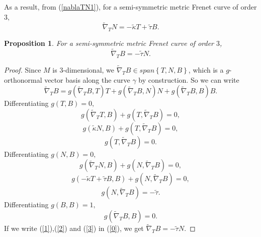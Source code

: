 \documentclass{amsart}
\theoremstyle{plain}
\newtheorem{proposition}{Proposition}
\theoremstyle{definition}
\theoremstyle{remark}
\numberwithin{equation}{section}
\begin{document}
As a result, from (\ref{nablaTN1}), for a semi-symmetric metric Frenet curve
of order $3,$ 
\begin{equation*}
\widetilde{\nabla }_{T}N=-\widetilde{\kappa }T+\widetilde{\tau }B.
\end{equation*}

\begin{proposition}
For a semi-symmetric metric Frenet curve of order $3$, 
\begin{equation*}
\widetilde{\nabla }_{T}B=-\widetilde{\tau }N.
\end{equation*}
\end{proposition}

\begin{proof}
Since $M$ is $3$-dimensional, we $\widetilde{\nabla }_{T}B\in span\left\{
T,N,B\right\} $, which is a $g$-orthonormal vector basis along the curve $%
\gamma $ by construction. So we can write%
\begin{equation}
\widetilde{\nabla }_{T}B=g\left( \widetilde{\nabla }_{T}B,T\right) T+g\left( 
\widetilde{\nabla }_{T}B,N\right) N+g\left( \widetilde{\nabla }%
_{T}B,B\right) B.  \label{0}
\end{equation}%
Differentiating $g\left( T,B\right) =0,$%
\begin{equation*}
g\left( \widetilde{\nabla }_{T}T,B\right) +g\left( T,\widetilde{\nabla }%
_{T}B\right) =0,
\end{equation*}%
\begin{equation*}
g\left( \widetilde{\kappa }N,B\right) +g\left( T,\widetilde{\nabla }%
_{T}B\right) =0,
\end{equation*}%
\begin{equation}
g\left( T,\widetilde{\nabla }_{T}B\right) =0.  \label{1}
\end{equation}%
Differentiating $g\left( N,B\right) =0,$%
\begin{equation*}
g\left( \widetilde{\nabla }_{T}N,B\right) +g\left( N,\widetilde{\nabla }%
_{T}B\right) =0,
\end{equation*}%
\begin{equation*}
g\left( -\widetilde{\kappa }T+\widetilde{\tau }B,B\right) +g\left( N,%
\widetilde{\nabla }_{T}B\right) =0,
\end{equation*}%
\begin{equation}
g\left( N,\widetilde{\nabla }_{T}B\right) =-\widetilde{\tau }.  \label{2}
\end{equation}%
Differentiating $g\left( B,B\right) =1,$%
\begin{equation}
g\left( \widetilde{\nabla }_{T}B,B\right) =0.  \label{3}
\end{equation}%
If we write (\ref{1}),(\ref{2}) and (\ref{3}) in (\ref{0}), we get $%
\widetilde{\nabla }_{T}B=-\widetilde{\tau }N.$
\end{proof}
\end{document}
